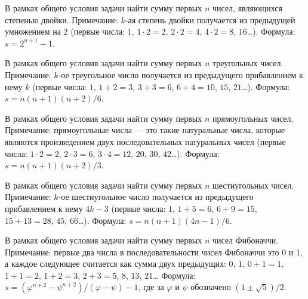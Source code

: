 
\begin{zztask}
В рамках общего условия задачи найти сумму первых $n$ чисел, являющихся
степенью двойки. Примечание: $k$-ая степень двойки получается из предыдущей
умножением на 2 (первые числа: $1$, $1\cdot2=2$, $2\cdot2=4$, $4\cdot2=8$, 
$16$\dots).
Формула: $s = 2^{n+1}-1$.
\end{zztask}


\begin{zztask}
В рамках общего условия задачи найти сумму первых $n$ треугольных чисел.
Примечание: $k$-ое треугольное число получается из предыдущего прибавлением
к нему $k$ (первые числа: $1$, $1+2=3$, $3+3=6$, $6+4=10$, $15$, $21$\dots).
Формула: $s = n(n+1)(n+2)/6$.
\end{zztask}


\begin{zztask}
В рамках общего условия задачи найти сумму первых $n$ прямоугольных чисел.
Примечание: прямоугольные числа --- это такие натуральные числа, которые
являются произведением двух последовательных натуральных чисел
(первые числа: $1\cdot2=2$, $2\cdot3=6$, $3\cdot4=12$, $20$, $30$, $42$\dots).
Формула: $s = n(n+1)(n+2)/3$.
\end{zztask}


\begin{zztask}
В рамках общего условия задачи найти сумму первых $n$ шестиугольных чисел.
Примечание: $k$-ое шестиугольное число получается из предыдущего прибавлением
к нему $4k-3$ (первые числа: $1$, $1+5=6$, $6+9=15$, $15+13=28$, $45$, $66$\dots).
Формула: $s = n(n+1)(4n-1)/6$.
\end{zztask}


\begin{zztask}
В рамках общего условия задачи найти сумму первых $n$ чисел Фибоначчи.
Примечание: первые
два числа в последовательности чисел Фибоначчи это 0 и 1, а каждое следующее
считается как сумма двух предыдущих: $0$, $1$, $0+1=1$, $1+1=2$, $1+2=3$, $2+3=5$,
$8$, $13$, $21$\dots
Формула: $s = (\varphi^{n+2}-\psi^{n+2})/(\varphi-\psi) - 1$, где за $\varphi$
и $\psi$ обозначено $(1\pm\sqrt5)/2$.
\end{zztask}

